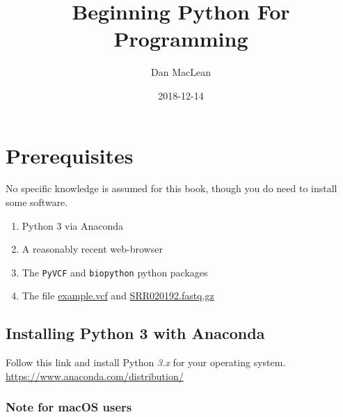 \documentclass[]{book}
\title{Beginning Python For Programming}
\author{Dan MacLean}
\date{2018-12-14}
\newenvironment{Shaded}{\begin{snugshade}}{\end{snugshade}}
\newcommand{\DataTypeTok}[1]{\textcolor[rgb]{0.13,0.29,0.53}{#1}}
\newcommand{\KeywordTok}[1]{\textcolor[rgb]{0.13,0.29,0.53}{\textbf{#1}}}
\newcommand{\NormalTok}[1]{#1}
\newcommand{\OperatorTok}[1]{\textcolor[rgb]{0.81,0.36,0.00}{\textbf{#1}}}
\newcommand{\StringTok}[1]{\textcolor[rgb]{0.31,0.60,0.02}{#1}}
\providecommand{\tightlist}{%
  \setlength{\itemsep}{0pt}\setlength{\parskip}{0pt}}
\theoremstyle{definition}
\theoremstyle{definition}
\theoremstyle{definition}
\theoremstyle{remark}
\begin{document}
\maketitle

{
\setcounter{tocdepth}{1}
\tableofcontents
}
\begin{Shaded}
\end{Shaded}

\hypertarget{prerequisites}{%
\chapter{Prerequisites}\label{prerequisites}}

No specific knowledge is assumed for this book, though you do need to
install some software.

\begin{enumerate}
\def\labelenumi{\arabic{enumi}.}
\tightlist
\item
  Python 3 via Anaconda
\item
  A reasonably recent web-browser
\item
  The \texttt{PyVCF} and \texttt{biopython} python packages
\item
  The file \href{assets/example.vcf}{example.vcf} and
  \href{assets/SRR020192.fastq.gz}{SRR020192.fastq.gz}
\end{enumerate}

\hypertarget{installing-python-3-with-anaconda}{%
\section{Installing Python 3 with
Anaconda}\label{installing-python-3-with-anaconda}}

Follow this link and install Python \emph{3.x} for your operating
system. \url{https://www.anaconda.com/distribution/}

\hypertarget{note-for-macos-users}{%
\subsection{Note for macOS users}\label{note-for-macos-users}}
\end{document}

